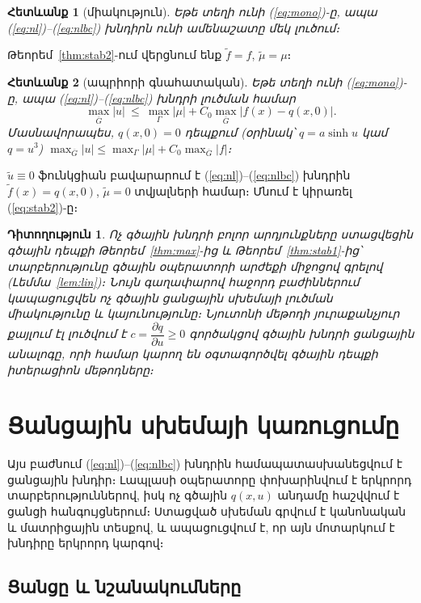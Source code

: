 \documentclass[12pt,a4paper]{article}
\makeatletter
\theoremstyle{arm}
\newtheorem{corollary}{Հետևանք}
\theoremstyle{armdef}
\newtheorem{remark}{Դիտողություն}
\renewcommand{\proofname}{Ապացույց։}
\renewenvironment{proof}[1][\proofname]{\par\pushQED{\qed}\normalfont\topsep6\p@\@plus6\p@\relax
  \trivlist\item[\hskip\labelsep\bfseries #1]\ignorespaces}{\popQED\endtrivlist\@endpefalse}
\numberwithin{equation}{section}
\newcommand{\G}{\overline{G}}
\newcommand{\dd}[2]{\dfrac{\partial #1}{\partial #2}}
\makeatother
\begin{document}
\begin{corollary}[միակություն]\label{cor:uniq}
Եթե տեղի ունի (\ref{eq:mono})-ը, ապա (\ref{eq:nl})--(\ref{eq:nlbc}) խնդիրն ունի ամենաշատը մեկ լուծում։
\end{corollary}

\begin{proof}
Թեորեմ~\ref{thm:stab2}-ում վերցնում ենք $\tilde f=f$, $\tilde\mu=\mu$։
\end{proof}

\begin{corollary}[ապրիորի գնահատական]\label{cor:apriori}
Եթե տեղի ունի (\ref{eq:mono})-ը, ապա (\ref{eq:nl})--(\ref{eq:nlbc}) խնդրի լուծման համար
\[\max_{\G}|u|\ \le\ \max_{\Gamma}|\mu|+C_0\max_{\G}\big|f(x)-q(x,0)\big|.\]
Մասնավորապես, $q(x,0)=0$ դեպքում (օրինակ՝ $q=a\sinh u$ կամ $q=u^3$) $\max_{\G}|u|\le\max_\Gamma|\mu|+C_0\max_{\G}|f|$։
\end{corollary}

\begin{proof}
$\tilde u\equiv0$ ֆունկցիան բավարարում է (\ref{eq:nl})--(\ref{eq:nlbc}) խնդրին $\tilde f(x)=q(x,0)$, $\tilde\mu=0$ տվյալների համար։ Մնում է կիրառել (\ref{eq:stab2})-ը։
\end{proof}

\begin{remark}
Ոչ գծային խնդրի բոլոր արդյունքները ստացվեցին գծային դեպքի Թեորեմ~\ref{thm:max}-ից և Թեորեմ~\ref{thm:stab1}-ից՝ տարբերությունը գծային օպերատորի արժեքի միջոցով գրելով (Լեմմա~\ref{lem:lin})։ Նույն գաղափարով հաջորդ բաժիններում կապացուցվեն ոչ գծային ցանցային սխեմայի լուծման միակությունը և կայունությունը։ Նյուտոնի մեթոդի յուրաքանչյուր քայլում էլ լուծվում է $c=\dd{q}{u}\ge0$ գործակցով գծային խնդրի ցանցային անալոգը, որի համար կարող են օգտագործվել գծային դեպքի իտերացիոն մեթոդները։
\end{remark}

\section{Ցանցային սխեմայի կառուցումը}

Այս բաժնում (\ref{eq:nl})--(\ref{eq:nlbc}) խնդրին համապատասխանեցվում է ցանցային խնդիր։ Լապլասի օպերատորը փոխարինվում է երկրորդ տարբերություններով, իսկ ոչ գծային $q(x,u)$ անդամը հաշվվում է ցանցի հանգույցներում։ Ստացված սխեման գրվում է կանոնական և մատրիցային տեսքով, և ապացուցվում է, որ այն մոտարկում է խնդիրը երկրորդ կարգով։

\subsection{Ցանցը և նշանակումները}
\end{document}
